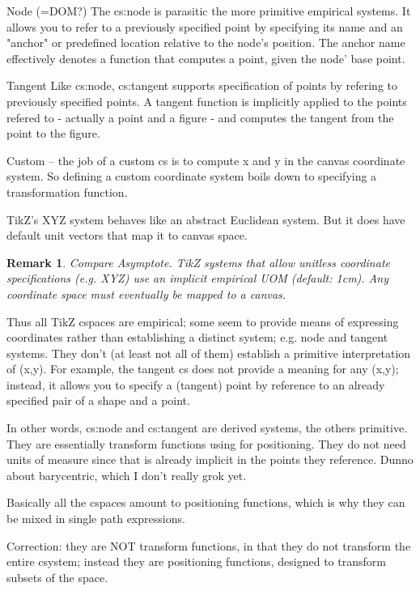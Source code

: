 \documentclass[12pt]{tufte-handout}
\numberwithin{equation}{subsection}
\numberwithin{equation}{subsection}
\newtheorem{remark}{Remark}
\newcommand\cspace{coordinate space}
\begin{document}
{\begin{appendices}
    Node (=DOM?)  The cs:node is parasitic the more primitive empirical
    systems.  It allows you to refer to a previously specified point by
    specifying its name and an "anchor" or predefined location relative to
    the node's position.  The anchor name effectively denotes a function
    that computes a point, given the node' base point.

    Tangent Like cs:node, cs:tangent supports specification of points by
    refering to previously specified points.  A tangent function is
    implicitly applied to the points refered to - actually a point and a
    figure - and computes the tangent from the point to the figure.

    Custom -- the job of a custom cs is to compute x and y in the canvas
    coordinate system.  So defining a custom coordinate system boils down
    to specifying a transformation function.

    TikZ's XYZ system behaves like an abstract Euclidean system.  But it
    does have default unit vectors that map it to canvas space.

    \begin{remark}
      Compare Asymptote.  TikZ systems that allow unitless coordinate
      specifications (e.g. XYZ) use an implicit empirical UOM (default:
      1cm).  Any \cspace{} must eventually be mapped to a canvas.
    \end{remark}

    Thus all TikZ cspaces are empirical; some seem to provide means of
    expressing coordinates rather than establishing a distinct system;
    e.g. node and tangent systems.  They don't (at least not all of them)
    establish a primitive interpretation of (x,y).  For example, the
    tangent cs does not provide a meaning for any (x,y); instead, it
    allows you to specify a (tangent) point by reference to an already
    specified pair of a shape and a point.

    In other words, cs:node and cs:tangent are derived systems, the others
    primitive.  They are essentially transform functions using for
    positioning.  They do not need units of measure since that is already
    implicit in the points they reference.  Dunno about barycentric, which
    I don't really grok yet.

    Basically all the cspaces amount to positioning functions, which is
    why they can be mixed in single path expressions.

    Correction: they are NOT transform functions, in that they do not
    transform the entire csystem; instead they are positioning functions,
    designed to transform subsets of the space.


\end{appendices}}
\end{document}
